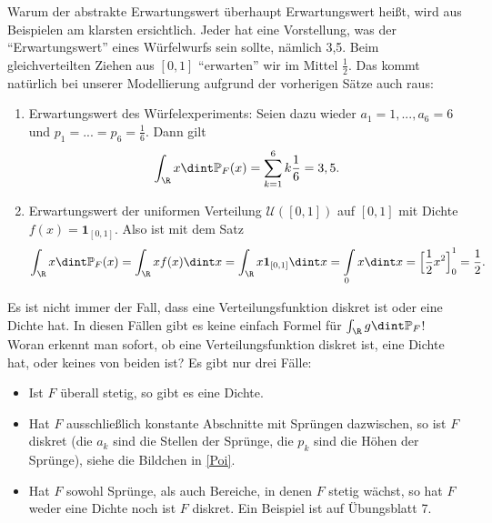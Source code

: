 Warum der abstrakte Erwartungswert \"uberhaupt Erwartungswert hei\ss t, wird aus Beispielen am klarsten ersichtlich. Jeder hat eine Vorstellung, was der \enquote{Erwartungswert} eines W\"urfelwurfs sein sollte, n\"amlich 3,5. Beim gleichverteilten Ziehen aus $[0,1]$ \enquote{erwarten} wir im Mittel $\frac 1 2$. Das kommt nat\"urlich bei unserer Modellierung aufgrund der vorherigen S\"atze auch raus:
\begin{beispiel}\abs
	\begin{enumerate}[label=(\roman*)]
		\item Erwartungswert des W\"urfelexperiments: Seien dazu wieder $a_1=1, ..., a_6=6$ und $p_1=...=p_6=\frac 1 6$. Dann gilt \[ \int_{\R} x \dint \mathbb{P}_F(x) = \sum\limits_{k = 1}^{6}k  \frac{1}{6} = 3,5. \]
		\item Erwartungswert der uniformen Verteilung $\mathcal{U}([0,1])$ auf $[0,1]$ mit Dichte $f(x) = \mathbf{1}_{[0,1]}$. Also ist mit dem Satz
		\[ \int_{\R} x \dint \mathbb{P}_F(x) = \int_{\R} x f(x) \dint x = \int_{\R} x \mathbf{1}_{[0,1]} \dint x = \int\limits_{0}	x \dint x = {\Big[ \frac{1}{2} x^2\Big]}_{0}^{1} = \frac{1}{2}. \]
	\end{enumerate}
\end{beispiel}

\begin{warnung}
	Es ist nicht immer der Fall, dass eine Verteilungsfunktion diskret ist oder eine Dichte hat. In diesen F\"allen gibt es keine einfach Formel für $\int_{\R} g \dint \mathbb{P}_F$! Woran erkennt man sofort, ob eine Verteilungsfunktion diskret ist, eine Dichte hat, oder keines von beiden ist? Es gibt nur drei F\"alle:
	\begin{itemize}
		\item Ist $F$ \"uberall stetig, so gibt es eine Dichte.
		\item Hat $F$ ausschlie\ss lich konstante Abschnitte mit Spr\"ungen dazwischen, so ist $F$ diskret (die $a_k$ sind die Stellen der Spr\"unge, die $p_k$ sind die H\"ohen der Spr\"unge), siehe die Bildchen in \ref{Poi}.
		\item Hat $F$ sowohl Spr\"unge, als auch Bereiche, in denen $F$ stetig w\"achst, so hat $F$ weder eine Dichte noch ist $F$ diskret. Ein Beispiel ist auf \"Ubungsblatt 7.
	\end{itemize}
\end{warnung}


